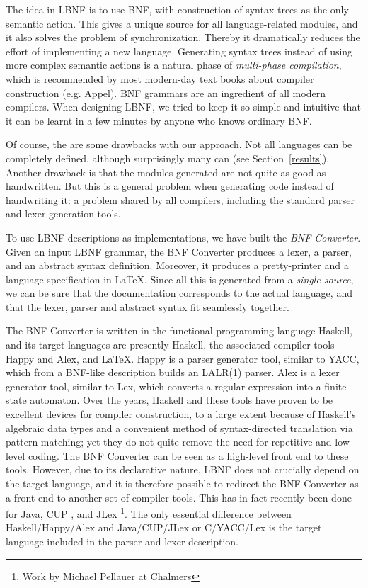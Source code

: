 \documentclass[10pt]{article}
\begin{document}
The idea in LBNF is to use BNF, with construction of syntax trees as
the only semantic action. This gives a unique source for all language-related
modules, and it also solves the problem of synchronization. Thereby it
dramatically reduces the effort of implementing a new language. Generating
syntax trees instead of using more complex semantic actions is 
a natural phase of \textit{multi-phase compilation}, which is recommended by most
modern-day text books about compiler construction (e.g. Appel\cite{appel}).
BNF grammars are an ingredient of all modern compilers.
When designing LBNF, we tried to keep it so simple and intuitive that
it can be learnt in a few minutes by anyone who knows ordinary BNF.

Of course, the are some drawbacks with our approach. 
Not all languages can be completely
defined, although surprisingly many can (see Section~\ref{results}). 
Another drawback is that the modules generated are not quite as good 
as handwritten. But this is a general problem when generating code instead 
of handwriting it: a problem shared by all compilers, including the
standard parser and lexer generation tools.

To use LBNF descriptions as implementations, we have
built the \textit{BNF Converter}\cite{bnfc}. 
Given an input LBNF grammar,
the BNF Converter produces a lexer, a parser, and an abstract 
syntax definition. Moreover, it produces a pretty-printer 
and a language specification in \LaTeX. 
Since all this is generated from a \textit{single source}, we can be sure
that the documentation corresponds to the actual 
language, and that the lexer, parser and abstract syntax fit
seamlessly together.

The BNF Converter is written in the functional programming language
Haskell\cite{haskell98}, and
its target languages are presently Haskell, the associated
compiler tools Happy\cite{happy} and Alex\cite{alex}, and \LaTeX.
Happy is a parser generator tool, similar to YACC\cite{johnson-yacc}, which
from a BNF-like description
builds an LALR(1) parser.
Alex is a lexer generator tool, similar to Lex\cite{lesk-lex},
which converts a regular expression 
into a finite-state automaton. 
Over the years, Haskell and these tools have 
proven to be excellent devices for compiler construction, 
to a large extent because of Haskell's 
algebraic data types and a convenient method of 
syntax-directed translation via pattern matching; 
yet they do not quite remove the need for repetitive and low-level
coding. The BNF Converter can be seen as a high-level front end
to these tools.
However, due to its declarative nature, LBNF
does not crucially depend on the target language, and
it is therefore possible to redirect the BNF Converter as a front end to
another set of compiler tools. This has in fact recently been done
for Java, CUP \cite{cup}, and 
JLex \cite{jlex}\footnote{Work by Michael Pellauer at Chalmers}.
The only essential difference between Haskell/Happy/Alex
and Java/CUP/JLex or C/YACC/Lex
is the target language included in the parser and
lexer description. 
\end{document}
